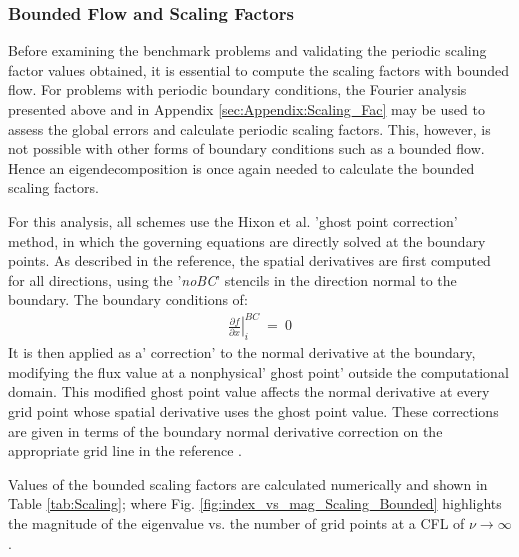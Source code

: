 \documentclass[conf]{new-aiaa}
\begin{document}
\subsubsection{Bounded Flow and Scaling Factors}
Before examining the benchmark problems and validating the periodic scaling factor values obtained, it is essential to compute the scaling factors with bounded flow.
For problems with periodic boundary conditions, the Fourier analysis presented above and in Appendix \ref{sec:Appendix:Scaling_Fac} may be used to assess the global errors and calculate periodic scaling factors. 
This, however, is not possible with other forms of boundary conditions such as a bounded flow. 
Hence an eigendecomposition is once again needed to calculate the bounded scaling factors. 

For this analysis, all schemes use the Hixon et al. 'ghost point correction' method, \cite{GPT, RDRP} in which the governing equations are directly solved at the boundary points. 
As described in the reference, the spatial derivatives are first computed for all directions, using the '\textit{noBC}' stencils in the direction normal to the boundary. 
The boundary conditions of:
\begin{equation}
	\begin{split}
		\label{eq:}
  			\left.\frac{\partial{f}}{\partial{x}}\right|_i^{BC}~=~0
	\end{split}
\end{equation}
It is then applied as a' correction' to the normal derivative at the boundary, modifying the flux value at a nonphysical' ghost point' outside the computational domain.
This modified ghost point value affects the normal derivative at every grid point whose spatial derivative uses the ghost point value. 
These corrections are given in terms of the boundary normal derivative correction on the appropriate grid line in the reference \cite{GPT, RDRP}. 

%  
Values of the bounded scaling factors are calculated numerically and shown in Table \ref{tab:Scaling}; where Fig. \ref{fig:index_vs_mag_Scaling_Bounded} highlights the magnitude of the eigenvalue vs. the number of grid points at a CFL of $\nu\to\infty$. 
\end{document}
